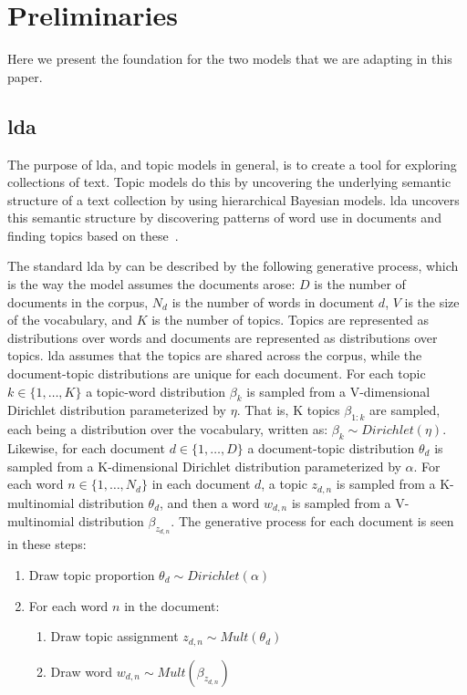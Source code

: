 \section{Preliminaries}\label{sec:preliminaries}
Here we present the foundation for the two models that we are adapting in this paper.

\subsection{\Acrlong{lda}}
The purpose of \gls{lda}, and topic models in general, is to create a tool for exploring collections of text.
Topic models do this by uncovering the underlying semantic structure of a text collection by using hierarchical Bayesian models.
\Gls{lda} uncovers this semantic structure by discovering patterns of word use in documents and finding topics based on these~\cite{blei2009topic}.

The standard \gls{lda} by \citet{blei2003latent} can be described by the following generative process, which is the way the model assumes the documents arose:
$D$ is the number of documents in the corpus, $N_d$ is the number of words in document $d$, $V$ is the size of the vocabulary, and $K$ is the number of topics.
Topics are represented as distributions over words and documents are represented as distributions over topics.
\Gls{lda} assumes that the topics are shared across the corpus, while the document-topic distributions are unique for each document.
For each topic $k \in \{1,\dots, K\}$ a topic-word distribution $\beta_k$ is sampled from a V-dimensional Dirichlet distribution parameterized by $\eta$.
That is, K topics $\beta_{1:k}$ are sampled, each being a distribution over the vocabulary, written as: $\beta_k \sim Dirichlet(\eta)$.
Likewise, for each document $d \in \{1,\dots, D\}$ a document-topic distribution $\theta_d$ is sampled from a K-dimensional Dirichlet distribution parameterized by $\alpha$.
For each word $n \in \{1, \dots, N_d\}$ in each document $d$, a topic $z_{d,n}$ is sampled from a K-multinomial distribution $\theta_d$, and then a word $w_{d,n}$ is sampled from a V-multinomial distribution $\beta_{z_{d,n}}$.
The generative process for each document is seen in these steps:

\vspace{\topsep}
\begin{enumerate}
	\item Draw topic proportion $\theta_d \sim Dirichlet(\alpha)$
	\item For each word $n$ in the document:
	\begin{enumerate}
		\item Draw topic assignment $z_{d,n} \sim Mult(\theta_d)$
		\item Draw word $w_{d,n} \sim Mult(\beta_{z_{d,n}})$
	\end{enumerate}
\end{enumerate}
\vspace{\topsep}

